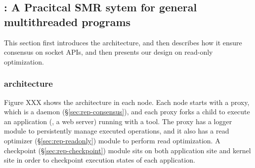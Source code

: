 


\subsection{\msmr: A Pracitcal SMR sytem for general multithreaded programs} \label{sec:rep-msmr}
This section first introduces the \msmr architecture, and then describes how it 
ensure consensus on socket APIs, and then presents our design on read-only 
optimization.

\subsubsection{\msmr architecture} \label{sec:rep-arch}

Figure XXX shows the \msmr architecture in each node. Each node starts with a proxy, 
which is a \paxos daemon (\S\ref{sec:rep-consensus}), and each proxy forks a child to execute an 
application (\eg, a web server) running with a \smt tool. The proxy has a logger module to 
persistently manage executed operations, and it also has a read optimizer (\S\ref{sec:rep-readonly})
module to perform read optimization. A checkpoint (\S\ref{sec:rep-checkpoint}) module sits on both 
application site and kernel site in order to checkpoint execution states of each application.


